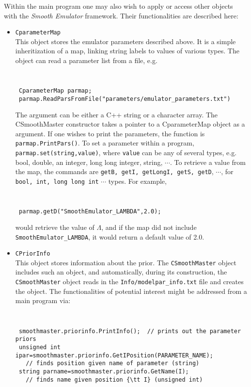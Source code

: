 \documentclass[UserManual.tex]{subfiles}
\begin{document}
Within the main program one may also wish to apply or access other objects with the {\it Smooth Emulator} framework. Their functionalities are described here:
\begin{itemize}\itemsep=0pt
\item {\tt CparameterMap}\\
This object stores the emulator parameters described above. It is a simple inheritization of a map, linking string labels to values of various types. The object can read a parameter list from a file, e.g.\\
{\tt
\begin{verbatim}
 CparameterMap parmap;
 parmap.ReadParsFromFile("parameters/emulator_parameters.txt")
\end{verbatim}}
The argument can be either a C++ string or a character array. The CSmoothMaster constructor takes a pointer to a CparameterMap object as a argument. If one wishes to print the parameters, the function is {\tt parmap.PrintPars()}. To set a parameter within a program, {\tt parmap.set(string,value)}, where {\tt value} can be any of several types, e.g. bool, double, an integer, long long integer, string, $\cdots$. To retrieve a value from the map, the commands are {\tt getB, getI, getLongI, getS, getD}, $\cdots$, for {\tt bool, int, long long int} $\cdots$ types. For example, 
{\tt
\begin{verbatim}
 parmap.getD("SmoothEmulator_LAMBDA",2.0);
\end{verbatim}}
would retrieve the value of $\Lambda$, and if the map did not include {\tt SmoothEmulator\_LAMBDA}, it would return a default value of 2.0.

\item {\tt CPriorInfo}\\
This object stores information about the prior. The {\tt CSmoothMaster} object includes such an object, and automatically, during its construction, the {\tt CSmoothMaster} object reads in the {\tt Info/modelpar\_info.txt} file and creates the object. The functionalities of potential interest might be addressed from a main program via:\\
{\tt
\begin{verbatim}
 smoothmaster.priorinfo.PrintInfo();  // prints out the parameter priors
 unsigned int ipar=smoothmaster.priorinfo.GetIPosition(PARAMETER_NAME);
   // finds position given name of parameter (string)
 string parname=smoothmaster.priorinfo.GetName(I);
   // finds name given position {\tt I} (unsigned int)
\end{verbatim}}


\end{itemize}
\end{document}
